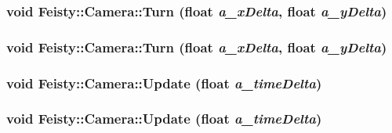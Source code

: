 \label{class_feisty_1_1_camera_ab579f233a45c7a2b629d240c36cdbb61}
\hypertarget{class_feisty_1_1_camera_aea1e6fbd53ad47e302f3fa38535cb3cd}{
\subsubsection[{Turn}]{\setlength{\rightskip}{0pt plus 5cm}void Feisty::Camera::Turn (float {\em a\_\-xDelta}, \/  float {\em a\_\-yDelta})}}
\label{class_feisty_1_1_camera_aea1e6fbd53ad47e302f3fa38535cb3cd}
\hypertarget{class_feisty_1_1_camera_aea1e6fbd53ad47e302f3fa38535cb3cd}{
\subsubsection[{Turn}]{\setlength{\rightskip}{0pt plus 5cm}void Feisty::Camera::Turn (float {\em a\_\-xDelta}, \/  float {\em a\_\-yDelta})}}
\label{class_feisty_1_1_camera_aea1e6fbd53ad47e302f3fa38535cb3cd}
\hypertarget{class_feisty_1_1_camera_ae633d0619f978c5104f2c8d5dbf10aa5}{
\subsubsection[{Update}]{\setlength{\rightskip}{0pt plus 5cm}void Feisty::Camera::Update (float {\em a\_\-timeDelta})}}
\label{class_feisty_1_1_camera_ae633d0619f978c5104f2c8d5dbf10aa5}
\hypertarget{class_feisty_1_1_camera_ae633d0619f978c5104f2c8d5dbf10aa5}{
\subsubsection[{Update}]{\setlength{\rightskip}{0pt plus 5cm}void Feisty::Camera::Update (float {\em a\_\-timeDelta})}}
\label{class_feisty_1_1_camera_ae633d0619f978c5104f2c8d5dbf10aa5}


